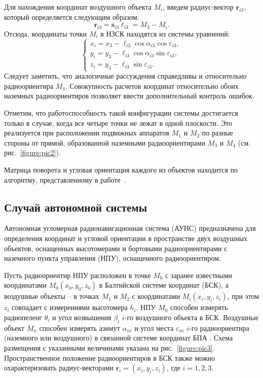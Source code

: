 \documentclass[../main.tex]{subfiles}
\begin{document}
Для нахождения координат воздушного объекта $M_i$, введем радиус-вектор $\mathbf{r}_{i3}$, который определяется следующим
образом:
\begin{equation}
    \mathbf{r}_{i3} = \mathbf{s}_{i3} \ell_{i3} = M_3 - M_i.
\end{equation}
Отсюда, координаты точки $M_i$ в НЗСК находятся из системы уравнений:
\begin{equation}
    \begin{cases}
        x_i = x_3 - \ell_{i3} \cos\alpha_{i3} \cos\varepsilon_{i3}, \\
        y_i = y_3 - \ell_{i3} \cos\alpha_{i3} \sin\varepsilon_{i3}, \\
        z_i = y_3 - \ell_{i3} \sin\varepsilon_{i3}.
    \end{cases}
\end{equation}
Следует заметить, что аналогичные рассуждения справедливы и относительно радиоориентира $M_4$. Совокупность
расчетов координат относительно обоих наземных радиоориентиров позволяет ввести дополнительный контроль ошибок.

Отметим, что работоспособность такой конфигурации системы достигается только в случае, когда все четыре точки не
лежат в одной плоскости. Это реализуется при расположении подвижных аппаратов $M_1$ и $M_2$ по разные стороны от прямой,
образованной наземными радиоориентирами $M_3$ и $M_4$ (см. рис.~\ref{figure:pic2}).

Матрица поворота и угловая ориентация каждого из объектов находится по алгоритму, представленному в работе~\cite{antennas}.

\subsection{Случай автономной системы}
Автономная угломерная радионавигационная система (АУНС) предназначена для определения
координат и угловой ориентации в пространстве двух воздушных объектов, оснащенных
высотомерами и бортовыми радиоориентирами с наземного пункта управления (НПУ),
оснащенного радиоориентиром.

Пусть радиоориентир НПУ расположен в точке $M_0$ с заранее известными координатами
$M_0\left(x_0, y_0, z_0\right)$ в Балтийской системе координат (БСК), а воздушные объекты
-- в точках $M_1$ и $M_2$ с координатами $M_i\left(x_i, y_i, z_i\right)$, при этом $z_i$
совпадает с измерениями высотомера $h_i$. НПУ $M_0$ способен измерять радиопеленг $\theta_i$
и угол возвышения $\beta_i$ $i$-го воздушного объекта в БСК. Воздушные объект $M_n$
способен измерять азимут $\alpha_{ni}$ и угол места $\varepsilon_{ni}$ $i$-го
радиоориентира (наземного или воздушного) в связанной системе координат БПА \cite{antennas}.
Схема размещения с указанными величинами указана на рис.~\ref{figure:pic3}.
Пространственное положение радиоориентиров в БСК также можно охарактеризовать радиус-векторами
$\mathbf{r}_i = \left(x_i, y_i, z_i\right)$, где $i = 1,2,3$.
\end{document}

